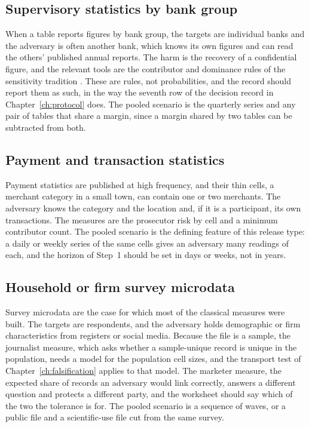 \subsection*{Supervisory statistics by bank group}

When a table reports figures by bank group, the targets are individual banks and the
adversary is often another bank, which knows its own figures and can read the
others' published annual reports. The harm is the recovery of a confidential figure,
and the relevant tools are the contributor and dominance rules of the sensitivity
tradition \citep{hundepool2012}. These are rules, not probabilities, and the record
should report them as such, in the way the seventh row of the decision record in
Chapter~\ref{ch:protocol} does. The pooled scenario is the quarterly series and any
pair of tables that share a margin, since a margin shared by two tables can be
subtracted from both.

\subsection*{Payment and transaction statistics}

Payment statistics are published at high frequency, and their thin cells, a merchant
category in a small town, can contain one or two merchants. The adversary knows the
category and the location and, if it is a participant, its own transactions. The
measures are the prosecutor risk by cell and a minimum contributor count. The pooled
scenario is the defining feature of this release type: a daily or weekly series of
the same cells gives an adversary many readings of each, and the horizon of
Step~1 should be set in days or weeks, not in years.

\subsection*{Household or firm survey microdata}

Survey microdata are the case for which most of the classical measures were built.
The targets are respondents, and the adversary holds demographic or firm
characteristics from registers or social media. Because the file is a sample, the
journalist measure, which asks whether a sample-unique record is unique in the
population, needs a model for the population cell sizes, and the transport test of
Chapter~\ref{ch:falsification} applies to that model. The marketer measure, the
expected share of records an adversary would link correctly, answers a different
question and protects a different party, and the worksheet should say which of the
two the tolerance is for. The pooled scenario is a sequence of waves, or a public
file and a scientific-use file cut from the same survey.


